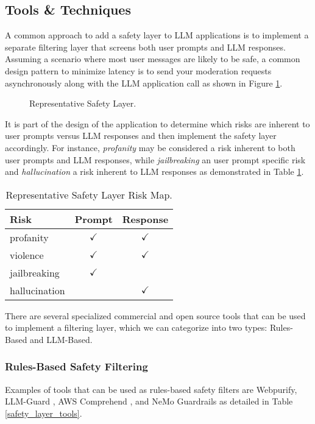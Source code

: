 \subsection{Tools \& Techniques}

A common approach to add a safety layer to LLM applications is to implement a separate filtering layer that screens both user prompts and LLM responses. Assuming a scenario where most user messages are likely to be safe, a common design pattern to minimize latency is to send your moderation requests asynchronously along with the LLM application call as shown in Figure \ref{safety_layer}.

\begin{figure}[H]
\centering

\caption{Representative Safety Layer.}
\label{safety_layer}
\end{figure}

It is part of the design of the application to determine which risks are inherent to user prompts versus LLM responses and then implement the safety layer accordingly. For instance, \textit{profanity} may be considered a risk inherent to both user prompts and LLM responses, while \textit{jailbreaking} an user prompt specific risk and \textit{hallucination} a risk inherent to LLM responses as demonstrated in Table \ref{safety_layer_table}.

\begin{table}[H]
\caption{Representative Safety Layer Risk Map.}
\label{safety_layer_table}
\centering
\begin{tabular}{|l|c|c|}
\hline
Risk & Prompt & Response \\
\hline
profanity & $\checkmark$ & $\checkmark$ \\
violence & $\checkmark$ & $\checkmark$ \\
jailbreaking & $\checkmark$ & \\
hallucination & & $\checkmark$ \\
\hline
\end{tabular}
\end{table}

There are several specialized commercial and open source tools that can be used to implement a filtering layer, which we can categorize into two types: Rules-Based and LLM-Based.
\subsubsection{Rules-Based Safety Filtering}

Examples of tools that can be used as rules-based safety filters are Webpurify, LLM-Guard , AWS Comprehend , and NeMo Guardrails  as detailed in Table \ref{safety_layer_tools}.

